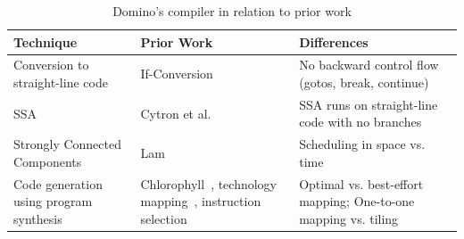 %
\begin{table}[!t]
  \begin{scriptsize}
    \begin{tabular}{|p{}|p{}|p{}|}
  \hline
  Technique & Prior Work & Differences \\
  \hline
  Conversion to straight-line code & If-Conversion~\cite{if_conversion} & No backward control flow (gotos, break, continue) \\
  \hline
  SSA & Cytron et al.~\cite{ssa} & SSA runs on straight-line code with no branches \\
  \hline
  Strongly Connected Components & Lam~\cite{software_pipelining} & Scheduling in space vs. time \\
  \hline
  Code generation using program synthesis & Chlorophyll~\cite{chlorophyll}, technology mapping~\cite{micheli}, instruction selection~\cite{muchnik} & Optimal vs. best-effort mapping; One-to-one mapping vs. tiling \\
  \hline
  \end{tabular}
  \end{scriptsize}
  \caption{Domino's compiler in relation to prior work}
  \label{tab:prior_compiler}
\end{table}
